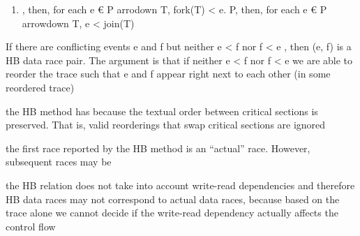 \documentclass[landscape, a4paper]{article}
\begin{document}
\begin{minipage}[t]{0.195\linewidth}
\begin{betterlist}
\begin{enumerate}
\begin{betterlist}
			\end{betterlist}
			\item {}, then, for each e € P arrodown T, fork(T) < e.   P, then, for each e €  P arrowdown T, e < join(T)
		\end{enumerate}
		\item {} If there are conflicting events e and f but neither e < f nor f < e , then (e, f) is a HB data race pair. The argument is that if neither e < f nor f < e we are able to reorder the trace such that e and f appear right next to each other (in some reordered trace)
		\item the HB method has  because the textual order between critical sections is preserved. That is, valid reorderings that swap critical sections are ignored
		\item the first race reported by the HB method is an \enquote{actual} race. However, subsequent races may be 
		\begin{betterlist}
			\item the HB relation does not take into account write-read dependencies and therefore HB data races may not correspond to actual data races, because based on the trace alone we cannot decide if the write-read dependency actually affects the control flow
		\end{betterlist}
	\end{betterlist}

\end{minipage}
\end{document}
